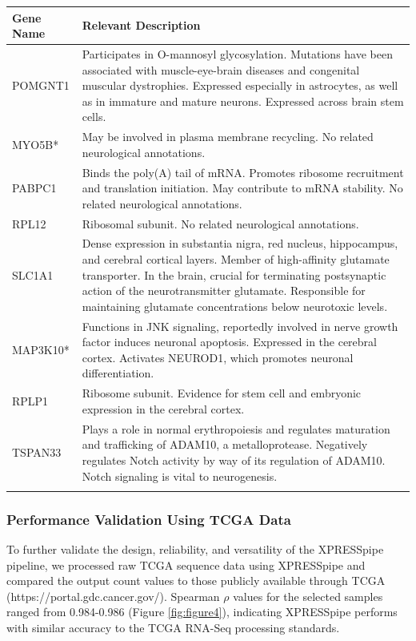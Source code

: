 \documentclass[10pt, oneside]{article}
\begin{document}
\begin{table}[!]
    \centering
{}
\begin{tabular}{p{2.5cm}p{15.5cm}}
 \textbf{Gene Name} & \textbf{Relevant Description} \\
 \hline
 POMGNT1 & Participates in O-mannosyl glycosylation. Mutations have been associated with muscle-eye-brain diseases and congenital muscular dystrophies. Expressed especially in astrocytes, as well as in immature and mature neurons. Expressed across brain stem cells. \\
 \hline
 MYO5B* & May be involved in plasma membrane recycling. No related neurological annotations. \\
 \hline
 PABPC1 & Binds the poly(A) tail of mRNA. Promotes ribosome recruitment and translation initiation. May contribute to mRNA stability. No related neurological annotations. \\
 \hline
 RPL12 & Ribosomal subunit. No related neurological annotations. \\
 \hline
 SLC1A1 & Dense expression in substantia nigra, red nucleus, hippocampus, and cerebral cortical layers. Member of high-affinity glutamate transporter. In the brain, crucial for terminating postsynaptic action of the neurotransmitter glutamate. Responsible for maintaining glutamate concentrations below neurotoxic levels. \\
 \hline
 MAP3K10* & Functions in JNK signaling, reportedly involved in nerve growth factor induces neuronal apoptosis. Expressed in the cerebral cortex. Activates NEUROD1, which promotes neuronal differentiation. \\
 \hline
 RPLP1 & Ribosome subunit. Evidence for stem cell and embryonic expression in the cerebral cortex. \\
 \hline
 TSPAN33 & Plays a role in normal erythropoiesis and regulates maturation and trafficking of ADAM10, a metalloprotease. Negatively regulates Notch activity by way of its regulation of ADAM10. Notch signaling is vital to neurogenesis. \\
 \label{tab:targets}
\end{tabular}
\end{table}


\subsubsection{Performance Validation Using TCGA Data}
To further validate the design, reliability, and versatility of the XPRESSpipe pipeline, we processed raw TCGA sequence data using XPRESSpipe and compared the output count values to those publicly available through TCGA (https://portal.gdc.cancer.gov/). Spearman $\rho$ values for the selected samples ranged from 0.984-0.986 (Figure \ref{fig:figure4}), indicating XPRESSpipe performs with similar accuracy to the TCGA RNA-Seq processing standards. \par
\end{document}

